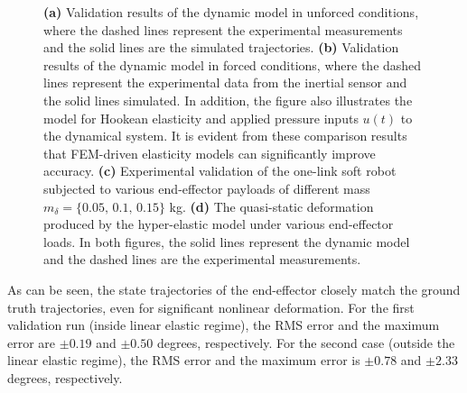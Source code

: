 %
\begin{figure}[!t]
\centering
\caption{\textbf{(a)} Validation results of the
dynamic model in unforced conditions, where the dashed lines represent the experimental measurements and the solid lines are the simulated trajectories. \textbf{(b)} Validation results of the dynamic model in forced conditions, where the dashed lines represent the experimental data from the inertial sensor and the solid lines simulated. In addition, the figure also illustrates the model for Hookean elasticity and applied pressure inputs $u(t)$ to the dynamical system. It is evident from these comparison results that FEM-driven elasticity models can significantly improve accuracy. \textbf{(c)} Experimental validation of the one-link soft robot subjected to various end-effector payloads of different mass $m_\delta = \{0.05,\,0.1,\,0.15\}$ kg. \textbf{(d)} The quasi-static deformation produced by the hyper-elastic model under various end-effector loads. In both figures, the solid lines represent the dynamic model and the dashed lines are the experimental measurements. \label{fig:6}}
\end{figure}
%
As can be seen, the state trajectories of the end-effector closely match the ground truth trajectories, even for significant nonlinear deformation. For the first validation run (inside linear elastic regime), the RMS error and the maximum error are $\pm0.19$ and $\pm 0.50$ degrees, respectively. For the second case (outside the linear elastic regime), the RMS error and the maximum error is $\pm0.78$ and $\pm 2.33$ degrees, respectively.

